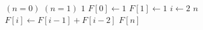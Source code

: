 \begin{codebox}
\li \If $(n = 0)$ \Or $(n = 1)$
\li	\Then
		\Return $1$
	\End
\li	$F[0] \gets 1$
\li	$F[1] \gets 1$ 
\li \For $i \gets 2$ \To $n$
\li \Do
		$F[i] \gets F[i-1] + F[i-2]$
	\End
\li \Return $F[n]$
\end{codebox}